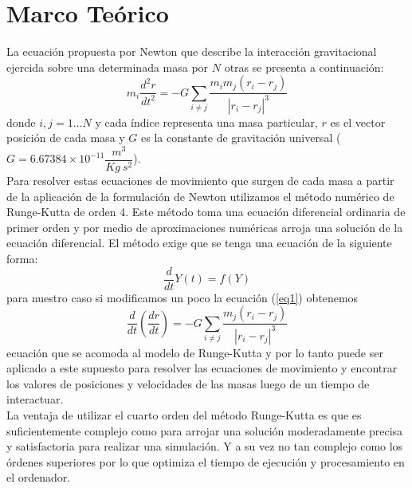 \documentclass[11pt,a4paper]{article}
\begin{document}
\section{\label{marco}Marco Teórico}
{
La ecuación propuesta por Newton que describe la interacción gravitacional ejercida sobre una determinada masa por $N$ otras se presenta a continuación:
\begin{equation}\label{eq1}
m_i \frac{d^2 r}{dt^2} = -G \sum_{i \neq j} \frac{m_i m_j (r_i - r_j)}{|r_{i} - r_{j}|^3}
\end{equation}
donde $i,j = 1 \dots N$ y cada índice representa una masa particular, $r$ es el vector posición de cada masa y $G$ es la constante de gravitación universal ( $G = 6.67384 \times 10^{-11} \dfrac{m^3}{Kg\ s^2}$).\\

Para resolver estas ecuaciones de movimiento que surgen de cada masa a partir de la aplicación de la formulación de Newton utilizamos el método numérico de Runge-Kutta de orden 4. Este método toma una ecuación diferencial ordinaria de primer orden y por medio de aproximaciones numéricas arroja una solución de la ecuación diferencial. El método  exige que se tenga una ecuación de la siguiente forma:
\begin{equation}
\frac{d}{dt} Y(t) = f(Y)
\end{equation}
para nuestro caso si modificamos un poco la ecuación (\ref{eq1}) obtenemos
\begin{equation}
\frac{d}{dt}\left(\frac{d r}{dt}\right) = -G \sum_{i \neq j} \frac{m_j (r_i - r_j)}{|r_{i} - r_{j}|^3}
\end{equation}
ecuación que se acomoda al modelo de Runge-Kutta y por lo tanto puede ser aplicado a este supuesto para resolver las ecuaciones de movimiento y encontrar los valores de posiciones y velocidades de las masas luego de un tiempo de interactuar.\\

La ventaja de utilizar el cuarto orden del método Runge-Kutta es que es suficientemente complejo como para arrojar una solución moderadamente precisa y satisfactoria para realizar una simulación. Y a su vez no tan complejo como los órdenes superiores por lo que optimiza el tiempo de ejecución y procesamiento en el ordenador.
}
\end{document}
